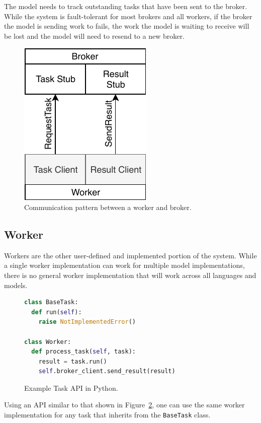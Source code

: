\documentclass[conference]{IEEEtran}
\begin{document}
The model needs to track outstanding tasks that have been sent to the broker.
While the system is fault-tolerant for most brokers and all workers, if the
broker the model is sending work to fails, the work the model is waiting to
receive will be lost and the model will need to resend to a new broker.

\begin{figure}
  \centering
  \includegraphics{img/broker_worker}
  \caption{Communication pattern between a worker and broker.}
  \label{fig:worker-broker}
\end{figure}

\subsection{Worker}
Workers are the other user-defined and implemented portion of the system. While
a single worker implementation can work for multiple model implementations,
there is no general worker implementation that will work across all languages
and models.

\begin{figure}
  \begin{lstlisting}[language=python]
class BaseTask:
  def run(self):
    raise NotImplementedError()

class Worker:
  def process_task(self, task):
    result = task.run()
    self.broker_client.send_result(result)
  \end{lstlisting}
  \caption{Example Task API in Python.}\label{fig:python-api}
\end{figure}

Using an API similar to that shown in Figure~\ref{fig:python-api}, one can use
the same worker implementation for any task that inherits from the
\texttt{BaseTask} class.
\end{document}
